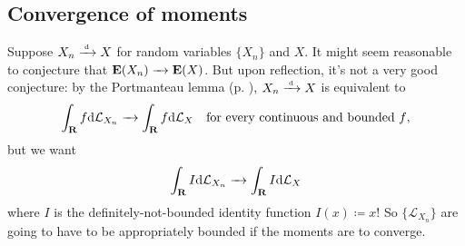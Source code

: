 \documentclass[11pt,letterpaper,reqno,oneside]{article}
\begin{document}
\subsection{Convergence of moments}
\label{sec:modes_of_convergence:conv_of_moments}

Suppose $X_n \xrightarrow{{\scriptscriptstyle \mathrm{\;d\;}}} X$ for random variables $\{ X_n \}$ and $X$. It might seem reasonable to conjecture that $\mathbf{E}(X_n) \xrightarrow{\;\;\;} \mathbf{E}(X)$. But upon reflection, it's not a very good conjecture: by the Portmanteau lemma (p. \pageref{lemma:Portmanteau}), $X_n \xrightarrow{{\scriptscriptstyle \mathrm{\;d\;}}} X$ is equivalent to
%
\begin{equation*}
	\int_{\mathbf{R}} f \mathrm{d} \mathcal{L}_{X_n} \xrightarrow{\;\;\;} \int_{\mathbf{R}} f \mathrm{d} \mathcal{L}_X
	\quad\text{for every continuous and bounded $f$} ,
\end{equation*}
%
but we want
%
\begin{equation*}
	\int_{\mathbf{R}} I \mathrm{d} \mathcal{L}_{X_n} \xrightarrow{\;\;\;} \int_{\mathbf{R}} I \mathrm{d} \mathcal{L}_X
\end{equation*}
%
where $I$ is the definitely-not-bounded identity function $I(x) \coloneqq x$! So $\{ \mathcal{L}_{X_n} \}$ are going to have to be appropriately bounded if the moments are to converge.
\end{document}
